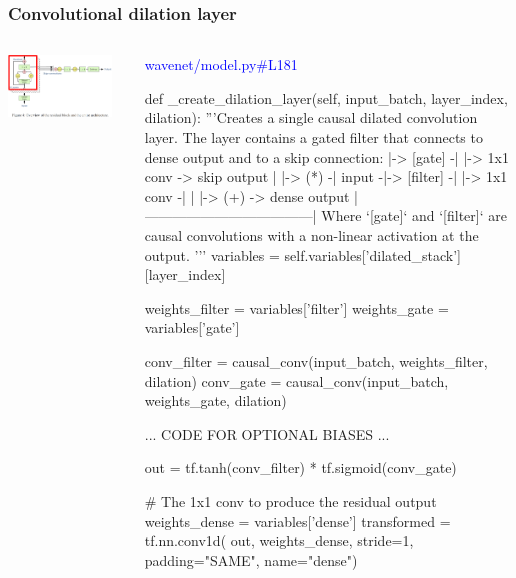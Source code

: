 \documentclass[8pt]{beamer}
\begin{document}
\begin{frame}[fragile]
\frametitle{Convolutional dilation layer}
\begin{columns}
\begin{column}{0.5\textwidth}
 
\includegraphics[width=0.9\textwidth]{./dl3_images/dilation_layer.png}

\end{column}
\begin{column}{0.5\textwidth}
 \textcolor{blue}{wavenet/model.py\#L181}
 
 \begin{verbnobox}[\tiny]
def _create_dilation_layer(self, input_batch, layer_index, dilation):
        '''Creates a single causal dilated convolution layer.
        The layer contains a gated filter that connects to dense output
        and to a skip connection:
               |-> [gate]   -|        |-> 1x1 conv -> skip output
               |             |-> (*) -|
        input -|-> [filter] -|        |-> 1x1 conv -|
               |                                    |-> (+) -> dense output
               |------------------------------------|
        Where `[gate]` and `[filter]` are causal convolutions with a
        non-linear activation at the output.
        '''
        variables = self.variables['dilated_stack'][layer_index]

        weights_filter = variables['filter']
        weights_gate = variables['gate']

        conv_filter = causal_conv(input_batch, weights_filter, dilation)
        conv_gate = causal_conv(input_batch, weights_gate, dilation)

        ... CODE FOR OPTIONAL BIASES ...

        out = tf.tanh(conv_filter) * tf.sigmoid(conv_gate)

        # The 1x1 conv to produce the residual output
        weights_dense = variables['dense']
        transformed = tf.nn.conv1d(
            out, weights_dense, stride=1, padding="SAME", name="dense")


\end{verbnobox}
\end{column}
\end{columns}
\end{frame}
\end{document}

